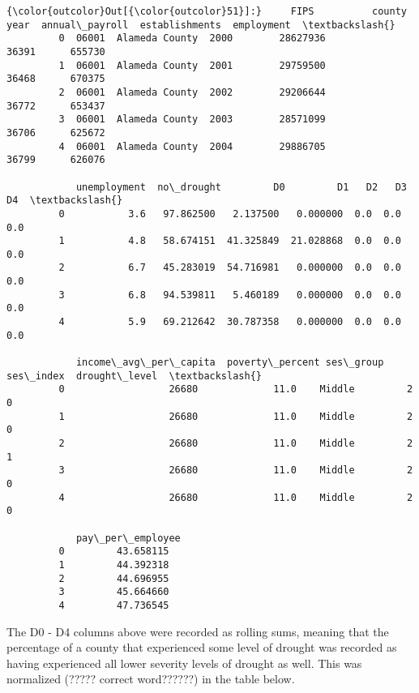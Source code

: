 \documentclass[11pt]{article}
\begin{document}
\begin{Verbatim}[commandchars=\\\{\}]
{\color{outcolor}Out[{\color{outcolor}51}]:}     FIPS          county  year  annual\_payroll  establishments  employment  \textbackslash{}
         0  06001  Alameda County  2000        28627936           36391      655730   
         1  06001  Alameda County  2001        29759500           36468      670375   
         2  06001  Alameda County  2002        29206644           36772      653437   
         3  06001  Alameda County  2003        28571099           36706      625672   
         4  06001  Alameda County  2004        29886705           36799      626076   
         
            unemployment  no\_drought         D0         D1   D2   D3   D4  \textbackslash{}
         0           3.6   97.862500   2.137500   0.000000  0.0  0.0  0.0   
         1           4.8   58.674151  41.325849  21.028868  0.0  0.0  0.0   
         2           6.7   45.283019  54.716981   0.000000  0.0  0.0  0.0   
         3           6.8   94.539811   5.460189   0.000000  0.0  0.0  0.0   
         4           5.9   69.212642  30.787358   0.000000  0.0  0.0  0.0   
         
            income\_avg\_per\_capita  poverty\_percent ses\_group ses\_index  drought\_level  \textbackslash{}
         0                  26680             11.0    Middle         2              0   
         1                  26680             11.0    Middle         2              0   
         2                  26680             11.0    Middle         2              1   
         3                  26680             11.0    Middle         2              0   
         4                  26680             11.0    Middle         2              0   
         
            pay\_per\_employee  
         0         43.658115  
         1         44.392318  
         2         44.696955  
         3         45.664660  
         4         47.736545  
\end{Verbatim}
            
    The D0 - D4 columns above were recorded as rolling sums, meaning that
the percentage of a county that experienced some level of drought was
recorded as having experienced all lower severity levels of drought as
well. This was normalized (????? correct word??????) in the table below.
\end{document}
